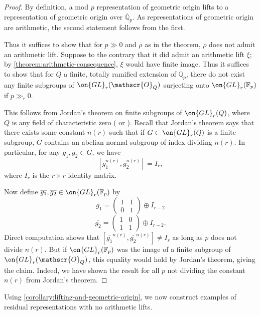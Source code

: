 \begin{proof}
	By definition, a mod $p$ representation of geometric origin lifts to a
representation of geometric origin over $\overline{\mathbb{Q}}_p$. As representations of geometric origin are arithmetic, the second statement follows from the first.

	Thus it suffices to show that for $p\gg 0$ and $\rho$ as in the theorem, $\rho$ does not admit an arithmetic lift. Suppose to the contrary that it did admit an arithmetic lift $\xi$; by \autoref{theorem:arithmetic-consequence}, $\xi$ would have finite image. Thus it suffices to show that for $Q$ a finite, totally ramified extension of $\mathbb{Q}_p$, there do not exist any finite subgroups of $\on{GL}_r(\mathscr{O}_Q)$ surjecting onto $\on{GL}_r(\mathbb{F}_p)$ if $p\gg_r 0$.

	This follows from Jordan's theorem on finite subgroups of $\on{GL}_r(Q)$,
	where $Q$ is any field of characteristic zero
	(\cite[p.~91]{jordan1878memoire} or \cite[Theorem
	36.13]{curtis1966representation}). Recall that Jordan's theorem says
	that there exists some constant $n(r)$ such that if $G\subset \on{GL}_r(Q)$ is a finite subgroup, $G$ contains an abelian normal subgroup of index dividing $n(r)$. In particular, for any $g_1, g_2\in G$, we have $$[g_1^{n(r)}, g_2^{n(r)}]=I_r,$$ where $I_r$ is the $r\times r$  identity matrix.

	Now define $\overline{g_1}, \overline{g_2}\in \on{GL}_r(\mathbb{F}_p)$ by
	$$\overline{g_1}=\begin{pmatrix} 1 & 1 \\ 0 & 1 \end{pmatrix} \oplus
	I_{r-2}$$ $$\overline{g_2}=\begin{pmatrix} 1 & 0 \\ 1 & 1 \end{pmatrix}
	\oplus I_{r-2}.$$ Direct computation shows that $[\overline{g_1}^{n(r)},
	\overline{g_2}^{n(r)}]\neq I_r$ as long as $p$ does not divide $n(r)$.
	But if $\on{GL}_r(\mathbb{F}_p)$ was the image of a finite subgroup of
	$\on{GL}_r(\mathscr{O}_Q)$, this equality would hold by Jordan's theorem, giving the claim. Indeed, we have shown the result for all $p$ not dividing the constant $n(r)$ from Jordan's theorem.
\end{proof}
Using \autoref{corollary:lifting-and-geometric-origin}, we now construct
examples of residual representations with no arithmetic lifts.
